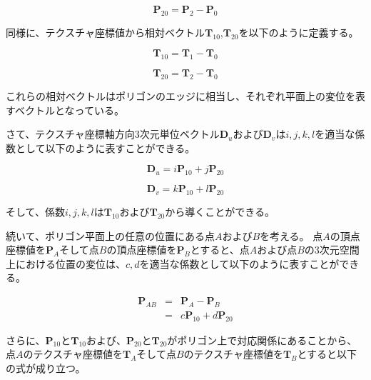 \begin{equation}
\bm{P}_{20} = \bm{P}_2 - \bm{P}_0
\label{EP20}
\end{equation}

\noindent
同様に、テクスチャ座標値から相対ベクトル$\bm{T}_{10}$,$\bm{T}_{20}$を以下のように定義する。

\begin{equation}
\bm{T}_{10} = \bm{T}_1 - \bm{T}_0
\label{ET10}
\end{equation}

\begin{equation}
\bm{T}_{20} = \bm{T}_2 - \bm{T}_0
\label{ET20}
\end{equation}

\noindent
これらの相対ベクトルはポリゴンのエッジに相当し、それぞれ平面上の変位を表すベクトルとなっている。

さて、テクスチャ座標軸方向3次元単位ベクトル$\bm{D}_u$および$\bm{D}_v$は$i,j,k,l$を適当な係数として以下のように表すことができる。

\begin{equation}
\bm{D}_u = i\bm{P}_{10} + j\bm{P}_{20}
\label{EUp}
\end{equation}

\begin{equation}
\bm{D}_v = k\bm{P}_{10} + l\bm{P}_{20}
\label{EVp}
\end{equation}

\noindent
そして、係数$i,j,k,l$は$\bm{T}_{10}$および$\bm{T}_{20}$から導くことができる。



続いて、ポリゴン平面上の任意の位置にある点$A$および$B$を考える。%
点$A$の頂点座標値を$\bm{P}_A$そして点$B$の頂点座標値を$\bm{P}_B$とすると、点$A$および点$B$の3次元空間上における位置の変位は、$c,d$を適当な係数として以下のように表すことができる。

\begin{eqnarray}
\bm{P}_{AB} &=& \bm{P}_A - \bm{P}_B\nonumber\\
           &=& c\bm{P}_{10} +  d\bm{P}_{20}  
\label{EPab}
\end{eqnarray}

\noindent
さらに、$\bm{P}_{10}$と$\bm{T}_{10}$および、$\bm{P}_{20}$と$\bm{T}_{20}$がポリゴン上で対応関係にあることから、点$A$のテクスチャ座標値を$\bm{T}_A$そして点$B$のテクスチャ座標値を$\bm{T}_B$とすると以下の式が成り立つ。

